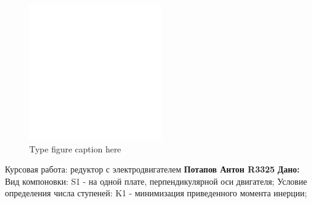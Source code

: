 \documentclass{article}
\title{\docTitle}
\author{\docGenerator}
\date{} %
\begin{document}
\maketitle
\thispagestyle{empty}
\newpage

\begin{figure}[h!]
 \begin{center}
  \includegraphics[max width=\textwidth]{calculations/0.png}
  \caption{Type figure caption here}
  \label{fig:0}
 \end{center}
\end{figure}
\colorbox[HTML]{808000}{\textcolor[HTML]{FFFF80}{Курсовая работа: редуктор с электродвигателем}}\newline
\colorbox[HTML]{000000}{\textcolor[HTML]{FFFF80}{\textbf{Потапов Антон R3325}}}\newline
\colorbox[HTML]{000000}{\textbf{Дано: }}\newline
\colorbox[HTML]{000000}{Вид компоновки:}\newline
\colorbox[HTML]{000000}{S1 - на одной плате, перпендикулярной оси двигателя;}\newline
\colorbox[HTML]{000000}{Условие определения числа ступеней:}\newline
\colorbox[HTML]{000000}{K1 - минимизация приведенного момента инерции;}\newline
\end{document}
